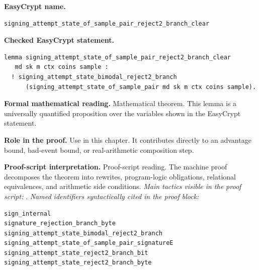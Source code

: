 \begin{formaltheorem}
\noindent\textbf{EasyCrypt name.}
\begin{lstlisting}[language=EasyCrypt,basicstyle=\ttfamily\scriptsize]
signing_attempt_state_of_sample_pair_reject2_branch_clear
\end{lstlisting}
\noindent\textbf{Checked EasyCrypt statement.}
\begin{lstlisting}[language=EasyCrypt,basicstyle=\ttfamily\scriptsize]
lemma signing_attempt_state_of_sample_pair_reject2_branch_clear
   md sk m ctx coins sample :
  ! signing_attempt_state_bimodal_reject2_branch
      (signing_attempt_state_of_sample_pair md sk m ctx coins sample).
\end{lstlisting}
\noindent\textbf{Formal mathematical reading.}
Mathematical theorem. This lemma is a universally quantified proposition over the variables shown in the EasyCrypt statement.

\noindent\textbf{Role in the proof.}
Use in this chapter. It contributes directly to an advantage bound, bad-event bound, or real-arithmetic composition step.

\noindent\textbf{Proof-script interpretation.}
Proof-script reading. The machine proof decomposes the theorem into rewrites, program-logic obligations, relational equivalences, and arithmetic side conditions.
\emph{Main tactics visible in the proof script:} .
\emph{Named identifiers syntactically cited in the proof block:}
\begin{lstlisting}[language=EasyCrypt,basicstyle=\ttfamily\scriptsize]
sign_internal
signature_rejection_branch_byte
signing_attempt_state_bimodal_reject2_branch
signing_attempt_state_of_sample_pair_signatureE
signing_attempt_state_reject2_branch_bit
signing_attempt_state_reject2_branch_byte
\end{lstlisting}

\end{formaltheorem}

